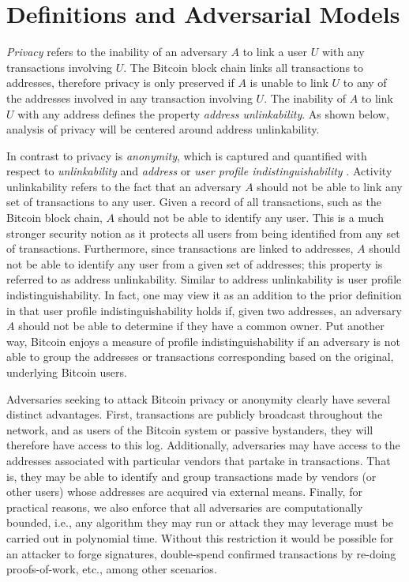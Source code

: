 \section{Definitions and Adversarial Models}
\emph{Privacy} refers to the inability of an adversary $A$ to link a user $U$ with any transactions involving $U$. The Bitcoin block chain links all transactions to addresses, therefore privacy is only preserved if $A$ is unable to link $U$ to any of the addresses involved in any transaction involving $U$. The inability of $A$ to link $U$ with any address defines the property \emph{address unlinkability}. As shown below, analysis of privacy will be centered around address unlinkability.

In contrast to privacy is \emph{anonymity}, which is captured and quantified with respect to \emph{unlinkability} and \emph{address} or \emph{user profile indistinguishability} \cite{Androulaki12-privacy}. Activity unlinkability refers to the fact that an adversary $A$ should not be able to link any set of transactions to any user. Given a record of all transactions, such as the Bitcoin block chain, $A$ should not be able to identify any user. This is a much stronger security notion as it protects all users from being identified from any set of transactions. Furthermore, since transactions are linked to addresses, $A$ should not be able to identify any user from a given set of addresses; this property is referred to as address unlinkability. Similar to address unlinkability is user profile indistinguishability. In fact, one may view it as an addition to the prior definition in that user profile indistinguishability holds if, given two addresses, an adversary $A$ should not be able to determine if they have a common owner. Put another way, Bitcoin enjoys a measure of profile indistinguishability if an adversary is not able to group the addresses or transactions corresponding based on the original, underlying Bitcoin users. 

Adversaries seeking to attack Bitcoin privacy or anonymity clearly have several distinct advantages. First, transactions are publicly broadcast throughout the network, and as users of the Bitcoin system or passive bystanders, they will therefore have access to this log. Additionally, adversaries may have access to the addresses associated with particular vendors that partake in transactions. That is, they may be able to identify and group transactions made by vendors (or other users) whose addresses are acquired via external means. Finally, for practical reasons, we also enforce that all adversaries are computationally bounded, i.e., any algorithm they may run or attack they may leverage must be carried out in polynomial time. Without this restriction it would be possible for an attacker to forge signatures, double-spend confirmed transactions by re-doing proofs-of-work, etc., among other scenarios. 

